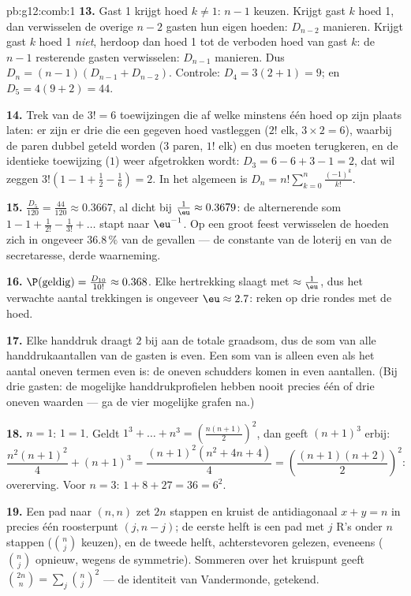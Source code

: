 \begin{solution}{pb:g12:comb:1}
\textbf{13.} Gast 1 krijgt hoed $k \neq 1$: $n - 1$ keuzen. Krijgt gast $k$
hoed 1, dan verwisselen de overige $n - 2$ gasten hun eigen hoeden:
$D_{n-2}$ manieren. Krijgt gast $k$ hoed 1 \emph{niet}, herdoop dan hoed 1
tot de verboden hoed van gast $k$: de $n - 1$ resterende gasten verwisselen:
$D_{n-1}$ manieren. Dus $D_n = (n-1)(D_{n-1} + D_{n-2})$. Controle:
$D_4 = 3(2 + 1) = 9$; en $D_5 = 4(9 + 2) = 44$.

\textbf{14.} Trek van de $3! = 6$ toewijzingen die af welke minstens één hoed
op zijn plaats laten: er zijn er drie die een gegeven hoed vastleggen ($2!$
elk, $3 \times 2 = 6$), waarbij de paren dubbel geteld worden ($3$ paren,
$1!$ elk) en dus moeten terugkeren, en de identieke toewijzing ($1$) weer
afgetrokken wordt: $D_3 = 6 - 6 + 3 - 1 = 2$, dat wil zeggen
$3!\left(1 - 1 + \frac12 - \frac16\right) = 2$. In het algemeen is
$D_n = n!\sum_{k=0}^{n} \frac{(-1)^k}{k!}$.

\textbf{15.} $\frac{D_5}{120} = \frac{44}{120} \approx 0.3667$, al dicht bij
$\frac1\eu \approx 0.3679$: de alternerende som
$1 - 1 + \frac{1}{2!} - \frac{1}{3!} + \dots$ stapt naar $\eu^{-1}$. Op een
groot feest verwisselen de hoeden zich in ongeveer $36.8\,\%$ van de
gevallen --- de constante van de loterij en van de secretaresse, derde
waarneming.

\textbf{16.} $\P(\text{geldig}) = \frac{D_{10}}{10!} \approx 0.368$. Elke
hertrekking slaagt met  $\approx \frac1\eu$, dus het verwachte aantal
trekkingen is ongeveer $\eu \approx 2.7$: reken op drie rondes met de hoed.

\textbf{17.} Elke handdruk draagt $2$ bij aan de totale graadsom, dus de som
van alle handdrukaantallen van de gasten is even. Een som van 
is alleen even als het aantal oneven termen even is: de oneven schudders
komen in even aantallen. (Bij drie gasten: de mogelijke handdrukprofielen
hebben nooit precies één of drie oneven waarden --- ga de vier mogelijke
grafen na.)

\textbf{18.} $n = 1$: $1 = 1$. Geldt
$1^3 + \dots + n^3 = \left(\frac{n(n+1)}{2}\right)^2$, dan geeft $(n+1)^3$
erbij:
\[
\frac{n^2(n+1)^2}{4} + (n+1)^3
= \frac{(n+1)^2\left(n^2 + 4n + 4\right)}{4}
= \left(\frac{(n+1)(n+2)}{2}\right)^{\!2} :
\]
overerving. Voor $n = 3$: $1 + 8 + 27 = 36 = 6^2$.

\textbf{19.} Een pad naar $(n, n)$ zet $2n$ stappen en kruist de
antidiagonaal $x + y = n$ in precies één roosterpunt $(j, n - j)$; de eerste
helft is een pad met $j$ R's onder $n$ stappen ($\binom nj$ keuzen), en de
tweede helft, achterstevoren gelezen, eveneens ($\binom nj$ opnieuw, wegens
de symmetrie). Sommeren over het kruispunt geeft
$\binom{2n}{n} = \sum_j \binom nj^2$ --- de identiteit van Vandermonde,
getekend.


\end{solution}
